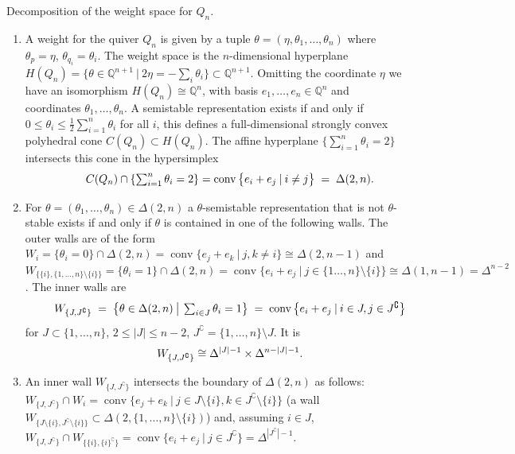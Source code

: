 \documentclass[ALCO,ThmDefs,Unicode,epreuves]{cedram}
\def\Q{\mathds Q}
\DeclareMathOperator{\conv}{conv}
\begin{document}
\begin{rema}\label{rem:Qn-weightspace} Decomposition of the weight space for $Q_n$. %

\begin{enumerate}[label=(\arabic*)]
\item\label{rema2.2_1}
A weight for the quiver $Q_n$ is given by a tuple 
$\theta=(\eta,\theta_1,\ldots,\theta_n)$ where %
$\theta_p=\eta$, $\theta_{q_i}=\theta_i$. 
The weight space is the $n$-dimensional hyperplane
$H(Q_n)= \{\theta\in\Q^{n+1}\:|\:2\eta=-\sum_i\theta_i\}\subset\Q^{n+1}$. 
Omitting the coordinate $\eta$ we have an isomorphism $H(Q_n)\cong\Q^n$, 
with basis $e_1,\ldots,e_n\in\Q^n$ and coordinates $\theta_1,\ldots,\theta_n$. 
A semistable representation exists if and only if 
$0\leq\theta_i\leq\frac{1}{2}\sum_{i=1}^n\theta_i$ for all $i$, 
this defines a full-dimensional strongly convex polyhedral cone $C(Q_n)\subset H(Q_n)$. 
The affine hyperplane $\{\sum_{i=1}^n\theta_i=2\}$ intersects 
this cone in the hypersimplex 
\[\hspace*{\leftmargini}\textstyle
C(Q_n)\cap\left\{\sum_{i=1}^n\theta_i=2\right\}=
\conv\big\{e_i+e_j\:|\:i\neq j\big\}\;=\;\Delta(2,n).
\]
\item\label{rema2.2_2} %
For $\theta=(\theta_1,\ldots,\theta_n)\in\Delta(2,n)$ a $\theta$-semistable 
representation that is not $\theta$-stable exists if and only if $\theta$ is 
contained in one of the following walls. The outer walls are of the form 
$W_i=\{\theta_i=0\}\cap\Delta(2,n)=\conv\{e_j+e_k\:|\:j,k\neq i\}
\cong\Delta(2,n-1)$ and 
$W_{\{\{i\},\{1,\ldots,n\}\setminus \{i\}\}}=\{\theta_i=1\}\cap\Delta(2,n)
=\conv\{e_i+e_j\:|\:j\in\{1\ldots,n\}\setminus\{i\}\}
\cong\Delta(1,n-1)=\Delta^{n-2}$.
The inner walls are 
\[\textstyle
\hspace*{\leftmargini}W_{\{J,J^\complement\}}\;=\;\big\{\theta\in\Delta(2,n)\:\big|\:\sum_{i\in J}\theta_i=1\big\}
\;=\;\conv\big\{e_i+e_j\:|\:i\in J,j\in J^\complement\big\}
\]
for $J\subset\{1,\ldots,n\}$, $2\leq|J|\leq n-2$, 
$J^\complement=\{1,\ldots,n\}\setminus J$. It is 
\[
\hspace*{\leftmargini}W_{\{J,J^\complement\}}\cong\Delta^{|J|-1}\times\Delta^{n-|J|-1}.
\] %

\item\label{rema2.2_3} %
An inner wall $W_{\{J,J^\complement\}}$ intersects the boundary of $\Delta(2,n)$
as follows:
$W_{\{J,J^\complement\}}\cap W_i=
\conv\{e_j+e_k\:|\:j\in J\setminus\{i\},k\in J^\complement\setminus\{i\}\}$ 
(\ie a wall $W_{\{J\setminus\{i\},J^\complement\setminus\{i\}\}}
\subset\Delta(2,\{1,\ldots,n\}\setminus\{i\})$)
and, assuming $i\in J$,
$W_{\{J,J^\complement\}}\cap W_{\{\{i\},\{i\}^\complement\}}
=\conv\{e_i+e_j\:|\:j\in J^\complement\}=\Delta^{|J^\complement|-1}$.%


\end{enumerate}
\end{rema}
\end{document}
